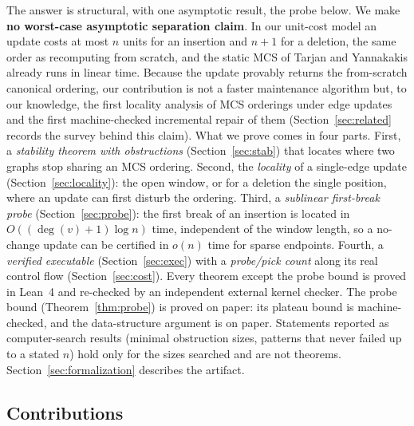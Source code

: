 \documentclass[11pt]{article}
\theoremstyle{definition}
\theoremstyle{remark}
\begin{document}
The answer is structural, with one asymptotic result, the probe below. We make
\textbf{no worst-case asymptotic separation claim}. In our unit-cost model an
update costs at most $n$ units for an insertion and $n+1$ for a deletion, the
same order as recomputing from scratch, and the static MCS of Tarjan and
Yannakakis already runs in linear time. Because the update provably returns the
from-scratch canonical ordering, our contribution is not a faster maintenance
algorithm but, to our knowledge, the first locality analysis of MCS orderings
under edge updates and the first machine-checked incremental repair of them
(Section~\ref{sec:related} records the survey behind this claim). What we prove
comes in four parts.
First, a \emph{stability theorem with obstructions} (Section~\ref{sec:stab})
that locates where two graphs stop sharing an MCS ordering. Second, the
\emph{locality} of a single-edge update (Section~\ref{sec:locality}): the open
window, or for a deletion the single position, where an update can first disturb
the ordering. Third, a \emph{sublinear first-break probe}
(Section~\ref{sec:probe}): the first break of an insertion is located in
$O((\deg(v)+1)\log n)$ time, independent of the window length, so a no-change
update can be certified in $o(n)$ time for sparse endpoints. Fourth, a
\emph{verified executable} (Section~\ref{sec:exec}) with a \emph{probe/pick
count} along its real control flow (Section~\ref{sec:cost}). Every theorem
except the probe bound is proved in Lean~4 and re-checked by an independent
external kernel checker. The probe bound (Theorem~\ref{thm:probe}) is proved on
paper: its plateau bound is machine-checked, and the data-structure argument is
on paper. Statements reported as
computer-search results (minimal obstruction sizes, patterns that never failed
up to a stated $n$) hold only for the sizes searched and are not theorems.
Section~\ref{sec:formalization} describes the artifact.

\subsection{Contributions}
\end{document}
